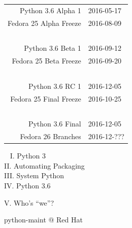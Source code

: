 \documentclass[1610,20pt]{beamer}
\newcommand\sk{\par\bigskip\bigskip\par}
\begin{document}
\begin{center}
\begin{frame}[fragile]

    \small
    \begin{tabular}{rl}
    Python 3.6 Alpha 1 & 2016-05-17 \\
    \color{fedblue} Fedora 25 Alpha Freeze & \color{fedblue} 2016-08-09 \\
    \pause~\\
    Python 3.6 Beta 1 & 2016-09-12 \\
    \color{fedblue} Fedora 25 Beta Freeze & \color{fedblue} 2016-09-20 \\
    \pause~\\
    Python 3.6 RC 1 & 2016-12-05 \\
    \color{fedblue} Fedora 25 Final Freeze & \color{fedblue} 2016-10-25 \\
    \pause~\\
    Python 3.6 Final & 2016-12-05 \\
    \color{fedblue} Fedora 26 Branches& \color{fedblue} 2016-12-??? \\
    \end{tabular}
\end{frame}

{
\begin{frame}[fragile]~
    {\color{mutegray} I. Python 3} \\
    {\color{mutegray} II. Automating Packaging} \\
    {\color{mutegray} III. System Python} \\
    {\color{mutegray} IV. Python 3.6} \\

    \sk\color{white}

    \huge
    V. Who's “we”?
\end{frame}
}

\begin{frame}[fragile]
    python-maint @ Red Hat
    \sk


\end{frame}
\end{center}
\end{document}
